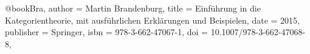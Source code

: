\usepackage[fixlanguage]{babelbib}

@book{Bra,
author = {Martin Brandenburg},
title = {Einf\"uhrung in die Kategorientheorie, mit ausf\"uhrlichen Erkl\"arungen und Beispielen},
date = {2015},
publisher = {Springer},
isbn = {978-3-662-47067-1},
doi = {10.1007/978-3-662-47068-8},
}
